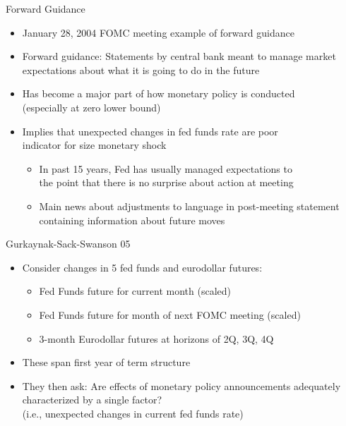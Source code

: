 \documentclass[11pt,aspectratio=169,xcolor={dvipsnames},hyperref={pdftex,pdfpagemode=UseNone,hidelinks,pdfdisplaydoctitle=true},usepdftitle=false]{beamer}
\begin{document}
\begin{frame}{Forward Guidance}
\begin{itemize}
\item January 28, 2004 FOMC meeting example of forward guidance 
\item Forward guidance: Statements by central bank meant to manage market expectations about what it is going to do in the future \pause 
\item Has become a major part of how monetary policy is conducted \\ (especially at zero lower bound) 
\item Implies that unexpected changes in fed funds rate are poor \\ indicator for size monetary shock
\begin{itemize}
\item In past 15 years, Fed has usually managed expectations to \\ the point that there is no surprise about action at meeting
\item Main news about adjustments to language in post-meeting statement \\ containing information about future moves
\end{itemize}
\end{itemize}
\end{frame}

\begin{frame}{Gurkaynak-Sack-Swanson 05}
\begin{itemize}
\item Consider changes in 5 fed funds and eurodollar futures:
\begin{itemize}
\item Fed Funds future for current month (scaled)
\item Fed Funds future for month of next FOMC meeting (scaled)
\item 3-month Eurodollar futures at horizons of 2Q, 3Q, 4Q
\end{itemize}
\item These span first year of term structure \pause
\item They then ask: Are effects of monetary policy announcements adequately characterized by a single factor? \\ 
(i.e., unexpected changes in current fed funds rate)
\end{itemize}
\end{frame}
\end{document}
